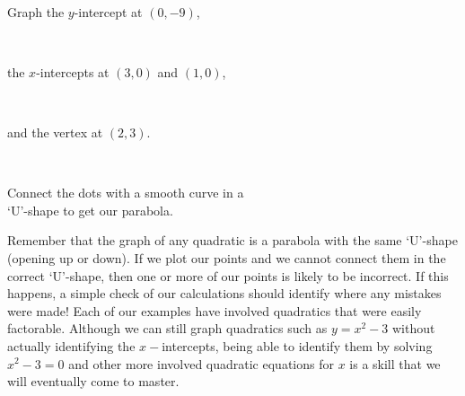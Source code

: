 \documentclass[12pt]{book}
\theoremstyle{definition}
\begin{document}
\begin{multicols}{2}
\begin{center}
\end{center}
\columnbreak
\ \par
Graph the $y$-intercept at $(0,-9)$,\par
\ \par
the $x$-intercepts at $(3,0)$ and $(1,0)$,\par
\ \par
and the vertex at $(2,3)$.\par
\ \par
Connect the dots with a smooth curve
in a\\
`U'-shape to get our parabola.
\end{multicols}
Remember that the graph of any quadratic is a parabola with the same `U'-shape (opening up or down).  If we plot our points and we cannot connect them in the correct `U'-shape, then one or more of our points is likely to be incorrect.  If this happens, a simple check of our calculations should identify where any mistakes were made!  Each of our examples have involved quadratics that were easily factorable.  Although we can still graph quadratics such as $y=x^2-3$ without actually identifying the $x-$intercepts, being able to identify them by solving $x^2-3=0$ and other more involved quadratic equations for $x$ is a skill that we will eventually come to master.
\end{document}
